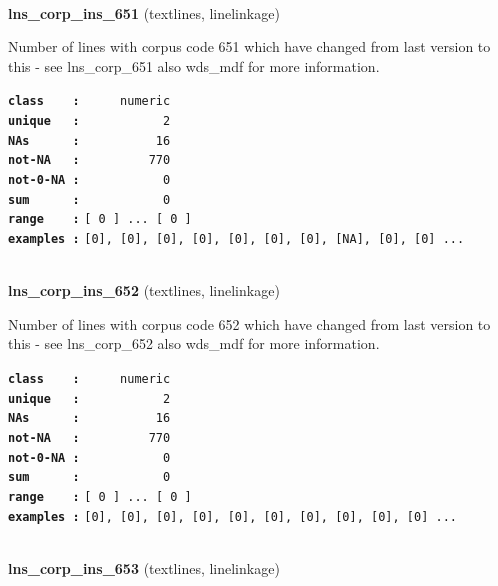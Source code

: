 \documentclass[]{article}
\begin{document}
~

\textbf{lns\_corp\_ins\_651} (textlines, linelinkage)

Number of lines with corpus code 651 which have changed from last
version to this - see lns\_corp\_651 also wds\_mdf for more information.

\textbf{\texttt{class\ \ \ \ :}} \texttt{~~~~~numeric}\\
\textbf{\texttt{unique\ \ \ :}} \texttt{~~~~~~~~~~~2}\\
\textbf{\texttt{NAs\ \ \ \ \ \ :}} \texttt{~~~~~~~~~~16}\\
\textbf{\texttt{not-NA\ \ \ :}} \texttt{~~~~~~~~~770}\\
\textbf{\texttt{not-0-NA\ :}} \texttt{~~~~~~~~~~~0}\\
\textbf{\texttt{sum\ \ \ \ \ \ :}} \texttt{~~~~~~~~~~~0}\\
\textbf{\texttt{range\ \ \ \ :}}
\texttt{{[}\ 0\ {]}\ ...\ {[}\ 0\ {]}}\\
\textbf{\texttt{examples\ :}}
\texttt{{[}0{]},\ {[}0{]},\ {[}0{]},\ {[}0{]},\ {[}0{]},\ {[}0{]},\ {[}0{]},\ {[}NA{]},\ {[}0{]},\ {[}0{]}\ ...}\\

~

\textbf{lns\_corp\_ins\_652} (textlines, linelinkage)

Number of lines with corpus code 652 which have changed from last
version to this - see lns\_corp\_652 also wds\_mdf for more information.

\textbf{\texttt{class\ \ \ \ :}} \texttt{~~~~~numeric}\\
\textbf{\texttt{unique\ \ \ :}} \texttt{~~~~~~~~~~~2}\\
\textbf{\texttt{NAs\ \ \ \ \ \ :}} \texttt{~~~~~~~~~~16}\\
\textbf{\texttt{not-NA\ \ \ :}} \texttt{~~~~~~~~~770}\\
\textbf{\texttt{not-0-NA\ :}} \texttt{~~~~~~~~~~~0}\\
\textbf{\texttt{sum\ \ \ \ \ \ :}} \texttt{~~~~~~~~~~~0}\\
\textbf{\texttt{range\ \ \ \ :}}
\texttt{{[}\ 0\ {]}\ ...\ {[}\ 0\ {]}}\\
\textbf{\texttt{examples\ :}}
\texttt{{[}0{]},\ {[}0{]},\ {[}0{]},\ {[}0{]},\ {[}0{]},\ {[}0{]},\ {[}0{]},\ {[}0{]},\ {[}0{]},\ {[}0{]}\ ...}\\

~

\textbf{lns\_corp\_ins\_653} (textlines, linelinkage)
\end{document}
